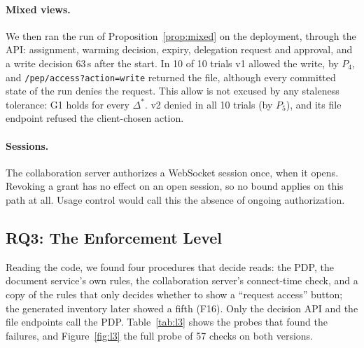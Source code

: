 \paragraph{Mixed views.} We then ran the run of Proposition~\ref{prop:mixed} on the deployment, through the API:
assignment, warming decision, expiry, delegation request and approval, and a write decision 63\,s after the start.
In 10 of 10 trials v1 allowed the write, by $P_4$, and \texttt{/pep/access?action=write} returned
the file, although every committed state of the run denies the request. This allow is not excused by any
staleness tolerance: G1 holds for every $\Delta^\ast$. v2 denied in all 10 trials (by $P_5$), and its file endpoint refused the client-chosen action.

\paragraph{Sessions.} The collaboration server authorizes a WebSocket session once, when it opens. Revoking a
grant has no effect on an open session, so no bound applies on this path at all. Usage control
\cite{park2004ucon} would call this the absence of ongoing authorization.


\subsection{RQ3: The Enforcement Level}
\label{sec:l3}

Reading the code, we found four procedures that decide reads: the \chain PDP, the document service's own
rules, the collaboration server's connect-time check, and a copy of the rules that only decides whether to show
a ``request access'' button; the generated inventory later showed a fifth (F16). Only the decision API and the
file endpoints call the PDP. Table~\ref{tab:l3}
shows the probes that found the failures, and Figure~\ref{fig:l3} the full probe of 57 checks on both versions.

